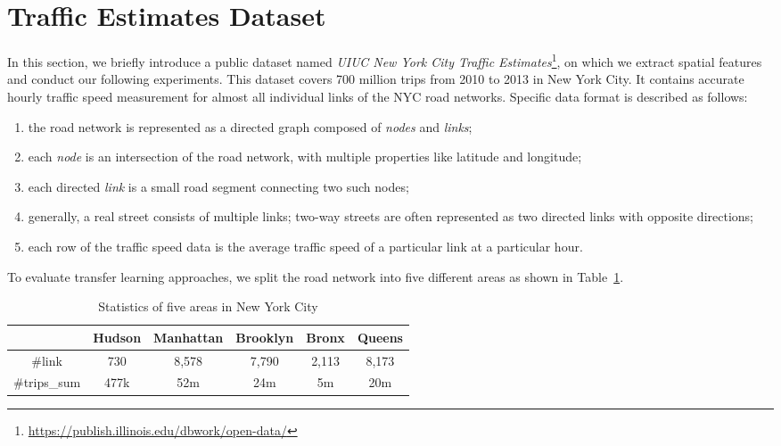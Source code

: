 \section{Traffic Estimates Dataset}
In this section, we briefly introduce a public dataset named \textit{UIUC New York City Traffic Estimates}\footnote{\url{https://publish.illinois.edu/dbwork/open-data/}}, on which we extract spatial features and conduct our following experiments.
This dataset covers 700 million trips from 2010 to 2013 in New York City. 
It contains accurate hourly traffic speed measurement for almost all individual links of the NYC road networks.
Specific data format is described as follows:
\begin{enumerate}
\item the road network is represented as a directed graph composed of \textit{nodes} and \textit{links}; 
\item each \textit{node} is an intersection of the road network, with multiple properties like latitude and longitude;  
\item each directed \textit{link} is a small road segment connecting two such nodes;   
\item generally, a real street consists of multiple links;
two-way streets are often represented as two directed links with opposite directions; 
\item each row of the traffic speed data is the average traffic speed of a particular link at a particular hour.
\end{enumerate}
To evaluate transfer learning approaches, we split the road network into five different areas as shown in Table~\ref{tab:regions}.

\begin{table}[t]
	\centering
	\small
	\caption{Statistics of five areas in New York City}
	\label{tab:regions}
	\begin{tabular}{|c|c|c|c|c|c|}
		\cline{1-6}
		~& {Hudson}  & {Manhattan}  & {Brooklyn}  & {Bronx}    & {Queens}    \\ \hline
		\#link           & 730     & 8,578       & 7,790      & 2,113     & 8,173      \\ \hline
		\#trips\_sum & 477k  & 52m  & 24m & 5m  & 20m  \\ \hline
	\end{tabular}
\end{table}


